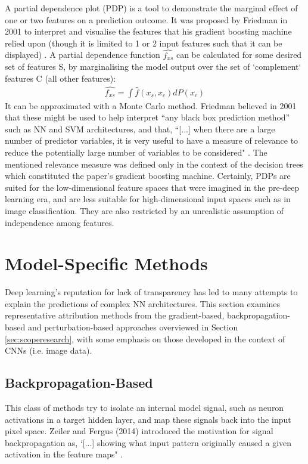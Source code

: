 \documentclass[main]{subfiles}
\begin{document}
A partial dependence plot (PDP) is a tool to demonstrate the marginal effect of one or two features on a prediction outcome. It was proposed by Friedman in 2001 to interpret and visualise the features that his gradient boosting machine relied upon (though it is limited to 1 or 2 input features such that it can be displayed) \cite{pdp1}. A partial dependence function $\widehat{f_{xs}}$ can be calculated for some desired set of features S, by marginalising the model output over the set of `complement` features C (all other features):
\begin{align}
\widehat{f_{xs}}=\int \widehat{f}(x_{s}, x_{c})dP(x_{c})
\end{align}
It can be approximated with a Monte Carlo method. Friedman believed in 2001 that these might be used to help interpret ``any black box prediction method'' such as NN and SVM architectures, and that, ``[...] when there are a large number of predictor variables, it is very useful to have a measure of relevance to reduce the potentially large number of variables to be considered" \cite{pdp1}. The mentioned relevance measure was defined only in the context of the decision trees which constituted the paper's gradient boosting machine. Certainly, PDPs are suited for the low-dimensional feature spaces that were imagined in the pre-deep learning era, and are less suitable for high-dimensional input spaces such as in image classification. They are also restricted by an unrealistic assumption of independence among features.

\section{Model-Specific Methods}
Deep learning's reputation for lack of transparency has led to many attempts to explain the predictions of complex NN architectures. This section examines representative attribution methods from the gradient-based, backpropagation-based and perturbation-based approaches overviewed in Section \ref{sec:scoperesearch}, with some emphasis on those developed in the context of CNNs (i.e. image data).


\subsection{Backpropagation-Based}

This class of methods try to isolate an internal model signal, such as neuron activations in a target hidden layer, and map these signals back into the input pixel space. Zeiler and Fergus (2014) introduced the motivation for signal backpropagation as, `[...] showing what input pattern originally caused a given activation in the feature maps" \cite{zeiler}. 
\end{document}
